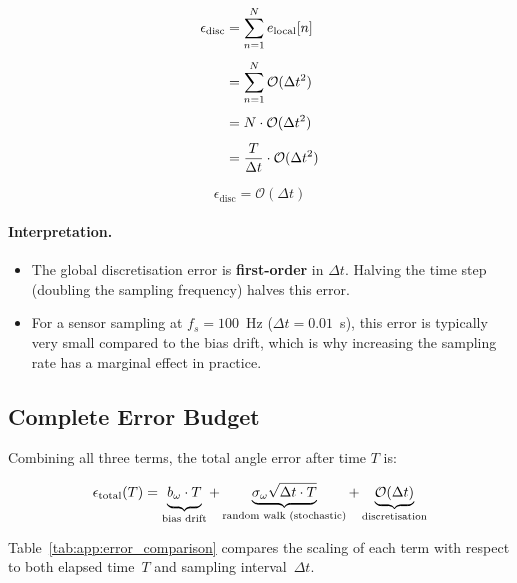 \begin{align}
  \epsilon_\text{disc}
  &= \sum_{n=1}^{N} e_\text{local}[n] \notag \\[4pt]
  &= \sum_{n=1}^{N} \mathcal{O}(\Delta t^2) \notag \\[4pt]
  &= N \cdot \mathcal{O}(\Delta t^2) \notag \\[4pt]
  &= \frac{T}{\Delta t} \cdot \mathcal{O}(\Delta t^2)
  \label{eq:app:global_derivation}
\end{align}

\begin{equation}
  \boxed{\;\epsilon_\text{disc} = \mathcal{O}(\Delta t)\;}
  \label{eq:app:disc_final}
\end{equation}

\paragraph{Interpretation.}
\begin{itemize}
  \item The global discretisation error is \textbf{first-order} in $\Delta t$.
        Halving the time step (doubling the sampling frequency) halves this
        error.
  \item For a sensor sampling at $f_s = 100$~Hz ($\Delta t = 0.01$~s), this
        error is typically very small compared to the bias drift, which is why
        increasing the sampling rate has a marginal effect in practice.
\end{itemize}

\subsection{Complete Error Budget}
\label{app:budget}

Combining all three terms, the total angle error after time $T$ is:

\begin{equation}
  \epsilon_\text{total}(T)
  = \underbrace{b_\omega \cdot T\vphantom{\sqrt{}}}_{\text{bias drift}}
  + \underbrace{\sigma_\omega\sqrt{\Delta t \cdot T}}_{\text{random walk (stochastic)}}
  + \underbrace{\mathcal{O}(\Delta t)}_{\text{discretisation}}
  \label{eq:app:total_budget}
\end{equation}

\noindent Table~\ref{tab:app:error_comparison} compares the scaling of each
term with respect to both elapsed time~$T$ and sampling interval~$\Delta t$.

